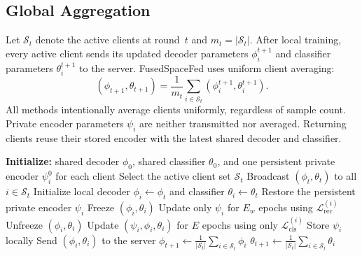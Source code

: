\documentclass[twoside]{article}
\theoremstyle{thmstyleone}%
\theoremstyle{thmstyletwo}%
\theoremstyle{thmstylethree}%
\begin{document}
\subsection{Global Aggregation}\label{sec:aggregation}

Let $\mathcal{S}_t$ denote the active clients at round~$t$ and
$m_t=|\mathcal{S}_t|$. After local training, every active client sends its
updated decoder parameters $\phi_i^{t+1}$ and classifier parameters
$\theta_i^{t+1}$ to the server. FusedSpaceFed uses uniform client averaging:
\begin{equation}
(\phi_{t+1},\theta_{t+1})=
\frac{1}{m_t}\sum_{i\in\mathcal S_t}(\phi_i^{t+1},\theta_i^{t+1}).
\label{eq:agg_dec}
\end{equation}
All methods intentionally average clients uniformly, regardless of sample
count. Private encoder parameters $\psi_i$
are neither transmitted nor averaged. Returning clients reuse their stored encoder with the latest shared
decoder and classifier.

\begin{algorithm}[H]
\caption{FusedSpaceFed training protocol}
\label{alg:fusedspacefed}
\small
\begin{algorithmic}[1]
\State \textbf{Initialize:} shared decoder $\phi_0$, shared classifier
$\theta_0$, and one persistent private encoder $\psi_i^0$ for each client
    \State Select the active client set $\mathcal{S}_t$
    \State Broadcast $(\phi_t,\theta_t)$ to all $i\in\mathcal{S}_t$
        \State Initialize local decoder $\phi_i\gets\phi_t$ and classifier
        $\theta_i\gets\theta_t$
        \State Restore the persistent private encoder $\psi_i$
        \State Freeze $(\phi_i,\theta_i)$
        \State Update only $\psi_i$ for $E_w$ epochs using
        $\mathcal{L}_{\mathrm{rec}}^{(i)}$
        \State Unfreeze $(\phi_i,\theta_i)$
        \State Update $(\psi_i,\phi_i,\theta_i)$ for $E$ epochs using only
        $\mathcal{L}_{\mathrm{cls}}^{(i)}$
        \State Store $\psi_i$ locally
        \State Send $(\phi_i,\theta_i)$ to the server
    \EndFor
    \State $\textstyle
    \phi_{t+1}\gets\frac{1}{|\mathcal{S}_t|}
    \sum_{i\in\mathcal{S}_t}\phi_i$
    \State $\textstyle
    \theta_{t+1}\gets\frac{1}{|\mathcal{S}_t|}
    \sum_{i\in\mathcal{S}_t}\theta_i$
\EndFor
\end{algorithmic}
\end{algorithm}

\end{document}
